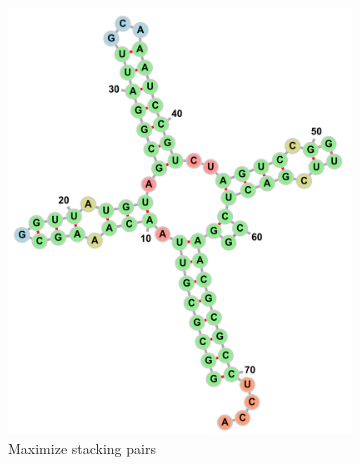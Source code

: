 \documentclass[10pt]{article}
\begin{document}
\begin{figure}[p]
\begin{subfigure}[b]{0.2\linewidth}
    \end{subfigure}
    \begin{subfigure}[b]{0.4\linewidth}
        \includegraphics[width=\linewidth]{./img/PDB_00313_maxstacks.png}
        \caption{Maximize stacking pairs}
    \end{subfigure}
    \begin{subfigure}[b]{0.4\linewidth}

\end{subfigure}
\end{figure}
\end{document}
